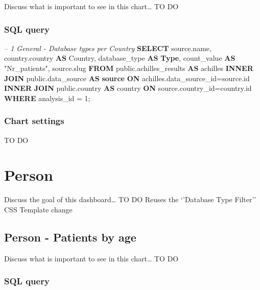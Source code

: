 \documentclass[]{book}
\newenvironment{Shaded}{\begin{snugshade}}{\end{snugshade}}
\newcommand{\KeywordTok}[1]{\textcolor[rgb]{0.13,0.29,0.53}{\textbf{#1}}}
\newcommand{\DecValTok}[1]{\textcolor[rgb]{0.00,0.00,0.81}{#1}}
\newcommand{\CommentTok}[1]{\textcolor[rgb]{0.56,0.35,0.01}{\textit{#1}}}
\newcommand{\OtherTok}[1]{\textcolor[rgb]{0.56,0.35,0.01}{#1}}
\newcommand{\NormalTok}[1]{#1}
\begin{document}
Discuss what is important to see in this chart\ldots{} TO DO

\subsection{SQL query}\label{sql-query-6}

\begin{Shaded}
\begin{Highlighting}[]
\CommentTok{-- 1    General - Database types per Country}
\KeywordTok{SELECT}\NormalTok{ source.name, }
\NormalTok{       country.country }\KeywordTok{AS}\NormalTok{ Country, }
\NormalTok{       database_type }\KeywordTok{AS} \KeywordTok{Type}\NormalTok{,}
\NormalTok{       count_value }\KeywordTok{AS} \OtherTok{"Nr_patients"}\NormalTok{,}
\NormalTok{       source.slug}
\KeywordTok{FROM}\NormalTok{ public.achilles_results }\KeywordTok{AS}\NormalTok{ achilles }\KeywordTok{INNER} \KeywordTok{JOIN} 
\NormalTok{    public.data_source }\KeywordTok{AS} \KeywordTok{source} \KeywordTok{ON}\NormalTok{ achilles.data_source_id=source.id}
    \KeywordTok{INNER} \KeywordTok{JOIN}\NormalTok{ public.country }\KeywordTok{AS}\NormalTok{ country }\KeywordTok{ON} 
\NormalTok{    source.country_id=country.id}
\KeywordTok{WHERE}\NormalTok{ analysis_id = }\DecValTok{1}\NormalTok{;}
\end{Highlighting}
\end{Shaded}

\subsection{Chart settings}\label{chart-settings-6}

TO DO

\chapter{Person}\label{person}

Discuss the goal of this dashboard\ldots{} TO DO Reuses the `'Database
Type Filter'' CSS Template change

\section{Person - Patients by age}\label{person---patients-by-age}

Discuss what is important to see in this chart\ldots{} TO DO

\subsection{SQL query}\label{sql-query-7}
\end{document}
